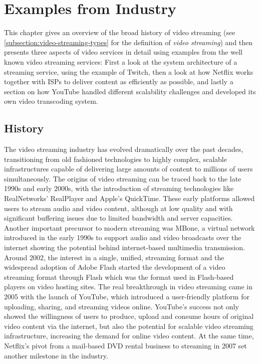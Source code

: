 \chapter{Examples from Industry}\label{chapter:examples}

This chapter gives an overview of the broad history of video streaming (see \autoref{subsection:video-streaming-types} for the definition of \textit{video streaming}) and then presents three aspects of video services in detail using examples from the well known video streaming services: First a look at the system architecture of a streaming service, using the example of Twitch, then a look at how Netflix works together with \ac{ISPs} to deliver content as efficiently as possible, and lastly a section on how YouTube handled different scalability challenges and developed its own video transcoding system.     

\section{History}
The video streaming industry has evolved dramatically over the past decades, transitioning from old fashioned technologies to highly complex, scalable infrastructures capable of delivering large amounts of content to millions of users simultaneously. The origins of video streaming can be traced back to the late 1990s and early 2000s, with the introduction of streaming technologies like RealNetworks' RealPlayer and Apple's QuickTime. These early platforms allowed users to stream audio and video content, although at low quality and with significant buffering issues due to limited bandwidth and server capacities.
Another important precursor to modern streaming was \ac{MBone}, a virtual network introduced in the early 1990s to support audio and video broadcasts over the internet showing the potential behind internet-based multimedia transmission. 
Around 2002, the interest in a single, unified, streaming format and the widespread adoption of Adobe Flash started the development of a video streaming format through Flash which was the format used in Flash-based players on video hosting sites.
The real breakthrough in video streaming came in 2005 with the launch of YouTube, which introduced a user-friendly platform for uploading, sharing, and streaming videos online. YouTube's success not only showed the willingness of users to produce, upload and consume hours of original video content via the internet, but also the potential for scalable video streaming infrastructure, increasing the demand for online video content. At the same time, Netflix's pivot from a mail-based DVD rental business to streaming in 2007 set another milestone in the industry. 


